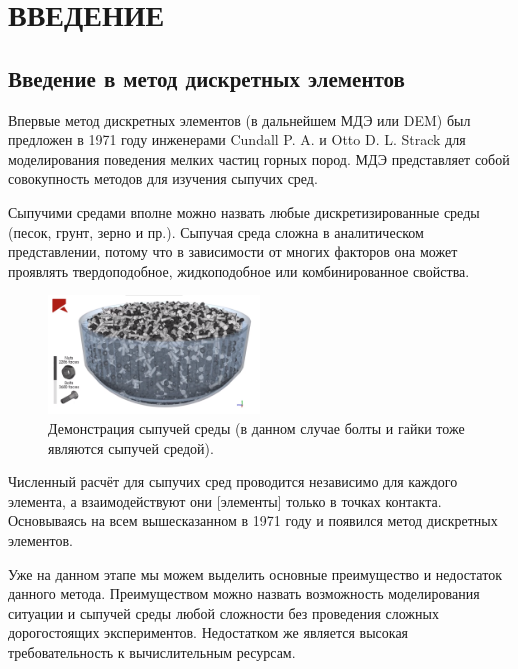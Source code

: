\documentclass[utf8x, 14pt, oneside, a4paper]{article}
\begin{document}
	\renewcommand{\contentsname}{\normalsize\bfseries\centering СОДЕРЖАНИЕ}
	\small
	\tableofcontents
	\normalsize

		\pagebreak

	\section*{ВВЕДЕНИЕ}


\subsection*{Введение в метод дискретных элементов}

Впервые метод дискретных элементов (в дальнейшем МДЭ или DEM) был предложен в 1971 году инженерами Cundall P. A. и Otto D. L. Strack \cite{cundall} для моделирования поведения мелких частиц горных пород. 
МДЭ представляет собой совокупность методов для изучения сыпучих сред. 

Сыпучими средами вполне можно назвать любые дискретизированные среды (песок, грунт, зерно и пр.). 
Сыпучая среда сложна в аналитическом представлении, потому что в зависимости от многих факторов она может проявлять твердоподобное, жидкоподобное или комбинированное свойства. 

\begin{figure}[h!]
	\centering
	\includegraphics[width=0.5\textwidth]{sreda}
	\caption{Демонстрация сыпучей среды (в данном случае болты и гайки тоже являются сыпучей средой).}
\end{figure} 

Численный расчёт для сыпучих сред проводится независимо для каждого элемента, а взаимодействуют они [элементы] только в точках контакта. 
Основываясь на всем вышесказанном в 1971 году и появился метод дискретных элементов.

Уже на данном этапе мы можем выделить основные преимущество и недостаток данного метода. 
Преимуществом можно назвать возможность моделирования ситуации и сыпучей среды любой сложности без проведения сложных дорогостоящих экспериментов. 
Недостатком же является высокая требовательность к вычислительным ресурсам.
\end{document}
